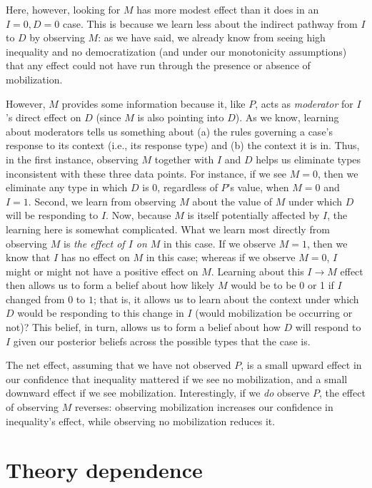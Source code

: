 \documentclass[
  12pt,
]{book}
\begin{document}
Here, however, looking for \(M\) has more modest effect than it does in an \(I=0, D=0\) case. This is because we learn less about the indirect pathway from \(I\) to \(D\) by observing \(M\): as we have said, we already know from seeing high inequality and no democratization (and under our monotonicity assumptions) that any effect could not have run through the presence or absence of mobilization.

However, \(M\) provides some information because it, like \(P\), acts as \emph{moderator} for \(I\)'s direct effect on \(D\) (since \(M\) is also pointing into \(D\)). As we know, learning about moderators tells us something about (a) the rules governing a case's response to its context (i.e., its response type) and (b) the context it is in. Thus, in the first instance, observing \(M\) together with \(I\) and \(D\) helps us eliminate types inconsistent with these three data points. For instance, if we see \(M=0\), then we eliminate any type in which \(D\) is 0, regardless of \(P\)'s value, when \(M=0\) and \(I=1\). Second, we learn from observing \(M\) about the value of \(M\) under which \(D\) will be responding to \(I\). Now, because \(M\) is itself potentially affected by \(I\), the learning here is somewhat complicated. What we learn most directly from observing \(M\) is \emph{the effect of \(I\) on \(M\)} in this case. If we observe \(M=1\), then we know that \(I\) has no effect on \(M\) in this case; whereas if we observe \(M=0\), \(I\) might or might not have a positive effect on \(M\). Learning about this \(I \rightarrow M\) effect then allows us to form a belief about how likely \(M\) would be to be 0 or 1 if \(I\) changed from \(0\) to \(1\); that is, it allows us to learn about the context under which \(D\) would be responding to this change in \(I\) (would mobilization be occurring or not)? This belief, in turn, allows us to form a belief about how \(D\) will respond to \(I\) given our posterior beliefs across the possible types that the case is.

The net effect, assuming that we have not observed \(P\), is a small upward effect in our confidence that inequality mattered if we see no mobilization, and a small downward effect if we see mobilization. Interestingly, if we \emph{do} observe \(P\), the effect of observing \(M\) reverses: observing mobilization increases our confidence in inequality's effect, while observing no mobilization reduces it.

\hypertarget{theory-dependence}{%
\section{Theory dependence}\label{theory-dependence}}
\end{document}
